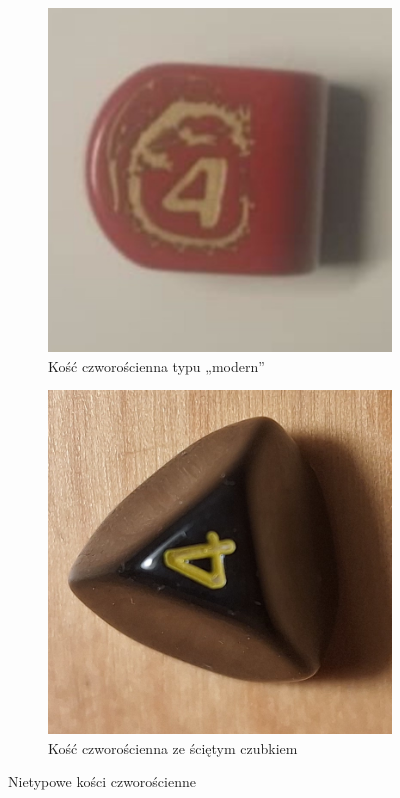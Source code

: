 \begin{figure}[h]
    \centering
      \begin{subfigure}{.43\textwidth}
        \includegraphics[width=.9\linewidth]{chapters/01-wstep/figures/modern_k4}
        \caption{\label{fig:modern_k4}Kość czworościenna typu „modern”}
      \end{subfigure}%
      \begin{subfigure}{.45\textwidth}
        \includegraphics[width=.9\linewidth, angle=-90, clip]{chapters/01-wstep/figures/nietypowe_k4}
        \caption{\label{fig:nietypowe_k4}Kość czworościenna ze ściętym czubkiem}
      \end{subfigure}%
    \caption{Nietypowe kości czworościenne}
    \label{fig:nietypowe_modern_k4}
\end{figure}